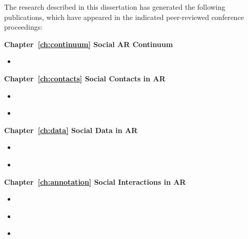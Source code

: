\begin{preface}
\addchaptertocentry{\prefacename} %

The research described in this dissertation has generated the following publications, which have appeared in the indicated peer-reviewed conference proceedings:

\preto{}

\noindent
\textbf{Chapter~\ref{ch:continuum} Social AR Continuum}
\begin{itemize}
    \item{ }
\end{itemize}

\noindent
\textbf{Chapter~\ref{ch:contacts} Social Contacts in AR}
\begin{itemize}
    \item{ }
    \item{ }
\end{itemize}

\noindent
\textbf{Chapter~\ref{ch:data} Social Data in AR}
\begin{itemize}
    \item{ }
    \item{ }
\end{itemize}

\noindent
\textbf{Chapter~\ref{ch:annotation} Social Interactions in AR}
\begin{itemize}
    \item{ }
    \item{ }
    \item{ }
\end{itemize}

\end{preface}